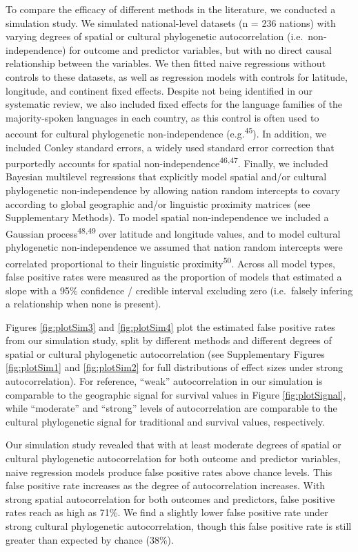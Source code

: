 \documentclass[english,man,floatsintext]{apa6}
\begin{document}
To compare the efficacy of different methods in the literature, we conducted a simulation study. We simulated national-level datasets (n = 236 nations) with varying degrees of spatial or cultural phylogenetic autocorrelation (i.e.~non-independence) for outcome and predictor variables, but with no direct causal relationship between the variables. We then fitted naive regressions without controls to these datasets, as well as regression models with controls for latitude, longitude, and continent fixed effects. Despite not being identified in our systematic review, we also included fixed effects for the language families of the majority-spoken languages in each country, as this control is often used to account for cultural phylogenetic non-independence (e.g.\textsuperscript{45}). In addition, we included Conley standard errors, a widely used standard error correction that purportedly accounts for spatial non-independence\textsuperscript{46,47}. Finally, we included Bayesian multilevel regressions that explicitly model spatial and/or cultural phylogenetic non-independence by allowing nation random intercepts to covary according to global geographic and/or linguistic proximity matrices (see Supplementary Methods). To model spatial non-independence we included a Gaussian process\textsuperscript{48,49} over latitude and longitude values, and to model cultural phylogenetic non-independence we assumed that nation random intercepts were correlated proportional to their linguistic proximity\textsuperscript{50}. Across all model types, false positive rates were measured as the proportion of models that estimated a slope with a 95\% confidence / credible interval excluding zero (i.e.~falsely infering a relationship when none is present).

Figures \ref{fig:plotSim3} and \ref{fig:plotSim4} plot the estimated false positive rates from our simulation study, split by different methods and different degrees of spatial or cultural phylogenetic autocorrelation (see Supplementary Figures \ref{fig:plotSim1} and \ref{fig:plotSim2} for full distributions of effect sizes under strong autocorrelation). For reference, \enquote{weak} autocorrelation in our simulation is comparable to the geographic signal for survival values in Figure \ref{fig:plotSignal}, while \enquote{moderate} and \enquote{strong} levels of autocorrelation are comparable to the cultural phylogenetic signal for traditional and survival values, respectively.

Our simulation study revealed that with at least moderate degrees of spatial or cultural phylogenetic autocorrelation for both outcome and predictor variables, naive regression models produce false positive rates above chance levels. This false positive rate increases as the degree of autocorrelation increases. With strong spatial autocorrelation for both outcomes and predictors, false positive rates reach as high as 71\%. We find a slightly lower false positive rate under strong cultural phylogenetic autocorrelation, though this false positive rate is still greater than expected by chance (38\%).
\end{document}
